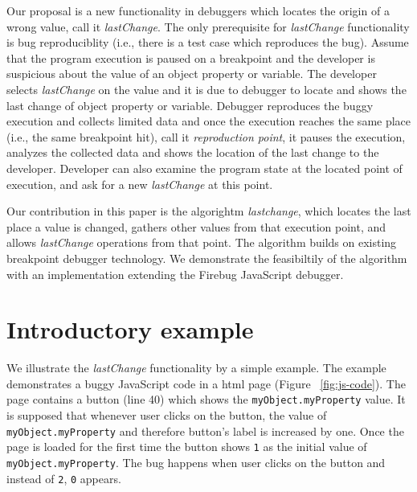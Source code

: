 \documentclass[preprint]{sigplanconf}
\begin{document}
Our proposal is a new functionality in debuggers which locates the origin of a wrong value, call it \textit{lastChange}. The only prerequisite for \textit{lastChange} functionality is bug reproduciblity (i.e., there is a test case which reproduces the bug). Assume that the program execution is paused on a breakpoint and the developer is suspicious about the value of an object property or variable. The developer selects \textit{lastChange} on the value and it is due to debugger to locate and shows the last change of object property or variable. Debugger reproduces the buggy execution and collects limited data and once the execution reaches the same place (i.e., the same breakpoint hit), call it \textit{reproduction point}, it pauses the execution, analyzes the collected data and shows the location of the last change to the developer. Developer can also examine the program state at the located point of execution, and ask for a new \textit{lastChange} at this point.

Our contribution in this paper is the algorightm \textit{lastchange}, which locates the last place a value is changed, gathers other values from that execution point, and allows \textit{lastChange} operations from that point. The algorithm builds on existing breakpoint debugger technology. We demonstrate the feasibiltily of the algorithm with an implementation extending the Firebug JavaScript debugger.



\section{Introductory example}
We illustrate the \textit{lastChange} functionality by a simple example. The example demonstrates a buggy JavaScript code in a html page (Figure ~\ref{fig:js-code}). The page contains a button (line 40) which shows the \texttt{myObject.myProperty} value. It is supposed that whenever user clicks on the button, the value of \texttt{myObject.myProperty} and therefore button's label is increased by one. Once the page is loaded for the first time the button shows \texttt{1} as the initial value of \texttt{myObject.myProperty}. The bug happens when user clicks on the button and instead of \texttt{2}, \texttt{0} appears. 
\end{document}
